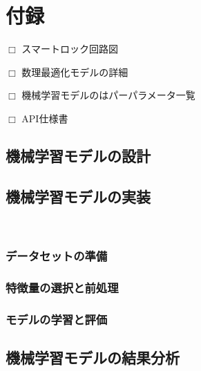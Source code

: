 \section{付録}
  \label{付録}
    \par $\Box$ スマートロック回路図
    \par $\Box$ 数理最適化モデルの詳細
    \par $\Box$ 機械学習モデルのはパーパラメータ一覧
    \par $\Box$ API仕様書
    
    \subsection{機械学習モデルの設計}
      \label{sec:machine_learning_model_design}
        \par

    \subsection{機械学習モデルの実装}
      \label{sec:機械学習モデルの実装}
      　\par 
      
      \subsubsection{データセットの準備}
        \label{sec:データセットの準備}
          \par
          
      \subsubsection{特徴量の選択と前処理}
        \label{sec:特徴量の選択と前処理}
          \par
          
      \subsubsection{モデルの学習と評価}
        \label{sec:モデルの学習と評価}
          \par
          
    \subsection{機械学習モデルの結果分析}
      \label{sec:機械学習モデルの結果分析}
        \par
